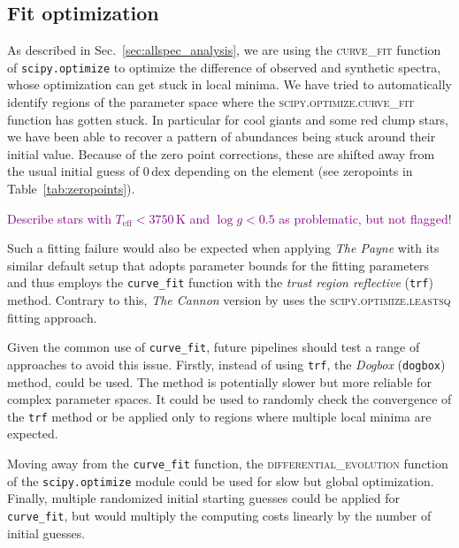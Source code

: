 \documentclass[
  journal=pasa,
  manuscript=research-paper, %
  year=2024,
  volume=37
]{cup-journal}
\newcommand{\SB}[1]{{\textcolor{purple}{#1}}}
\begin{document}
\subsection{Fit optimization} \label{sec:caveats_fitting}

As described in Sec.~\ref{sec:allspec_analysis}, we are using the \textsc{curve\_fit} function of \texttt{scipy.optimize} \citep{scipy} to optimize the difference of observed and synthetic spectra, whose optimization can get stuck in local minima. We have tried to automatically identify regions of the parameter space where the \textsc{scipy.optimize.curve\_fit} function has gotten stuck. In particular for cool giants and some red clump stars, we have been able to recover a pattern of abundances being stuck around their initial value. Because of the zero point corrections, these are shifted away from the usual initial guess of $0\,\mathrm{dex}$ depending on the element (see zeropoints in Table~\ref{tab:zeropoints}).

\SB{Describe stars with $T_\mathrm{eff} < 3750\,\mathrm{K}$ and $\log g < 0.5$ as problematic, but not flagged!}

Such a fitting failure would also be expected when applying \textit{The Payne} \citep{Ting2019} with its similar default setup that adopts parameter bounds for the fitting parameters and thus employs the \texttt{curve\_fit} function with the \textit{trust region reflective} (\texttt{trf}) method. Contrary to this, \textit{The Cannon} version by \citep{Casey2016} uses the \textsc{scipy.optimize.leastsq} fitting approach.

Given the common use of \texttt{curve\_fit}, future pipelines should test a range of approaches to avoid this issue. Firstly, instead of using \texttt{trf}, the \textit{Dogbox} (\texttt{dogbox}) method,  could be used. The method is potentially slower but more reliable for complex parameter spaces. It could be used to randomly check the convergence of the \texttt{trf} method or be applied only to regions where multiple local minima are expected.

Moving away from the \texttt{curve\_fit} function, the \textsc{differential\_evolution} function of the \texttt{scipy.optimize} module could be used for slow but global optimization. Finally, multiple randomized initial starting guesses could be applied for \texttt{curve\_fit}, but would multiply the computing costs linearly by the number of initial guesses.
\end{document}
